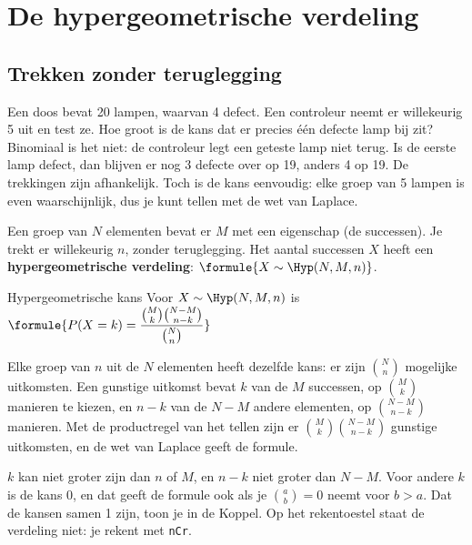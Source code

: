 \section{De hypergeometrische verdeling}

\subsection{Trekken zonder teruglegging}

Een doos bevat 20 lampen, waarvan 4 defect. Een controleur neemt er willekeurig 5 uit en test ze. Hoe groot is de kans dat er precies één defecte lamp bij zit? Binomiaal is het niet: de controleur legt een geteste lamp niet terug. Is de eerste lamp defect, dan blijven er nog 3 defecte over op 19, anders 4 op 19. De trekkingen zijn afhankelijk. Toch is de kans eenvoudig: elke groep van 5 lampen is even waarschijnlijk, dus je kunt tellen met de wet van Laplace.

\begin{theorie}
Een groep van $N$ elementen bevat er $M$ met een eigenschap (de successen). Je trekt er willekeurig $n$, zonder teruglegging. Het aantal successen $X$ heeft een \textbf{\textcolor{accent}{hypergeometrische verdeling}}: $\formule{X \sim \Hyp(N, M, n)}$.

\begin{stelling}{Hypergeometrische kans}
Voor $X \sim \Hyp(N, M, n)$ is \quad $\formule{P(X = k) = \dfrac{\binom{M}{k}\binom{N - M}{n - k}}{\binom{N}{n}}}$
\end{stelling}

\begin{bewijs}
Elke groep van $n$ uit de $N$ elementen heeft dezelfde kans: er zijn $\binom{N}{n}$ mogelijke uitkomsten. Een gunstige uitkomst bevat $k$ van de $M$ successen, op $\binom{M}{k}$ manieren te kiezen, en $n - k$ van de $N - M$ andere elementen, op $\binom{N-M}{n-k}$ manieren. Met de productregel van het tellen zijn er $\binom{M}{k}\binom{N-M}{n-k}$ gunstige uitkomsten, en de wet van Laplace geeft de formule.
\end{bewijs}
\end{theorie}

$k$ kan niet groter zijn dan $n$ of $M$, en $n - k$ niet groter dan $N - M$. Voor andere $k$ is de kans 0, en dat geeft de formule ook als je $\binom{a}{b} = 0$ neemt voor $b > a$. Dat de kansen samen 1 zijn, toon je in de Koppel. Op het rekentoestel staat de verdeling niet: je rekent met \texttt{nCr}.

